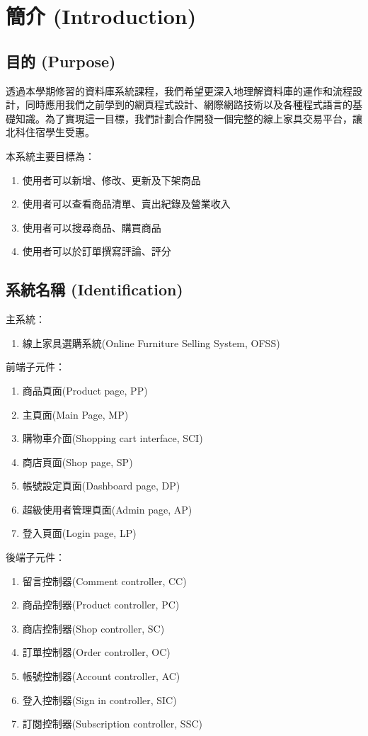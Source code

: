 \documentclass[a4paper, 12pt]{article}
\begin{document}

\section{簡介 (Introduction)}

\subsection{目的 (Purpose)}

透過本學期修習的資料庫系統課程，我們希望更深入地理解資料庫的運作和流程設計，同時應用我們之前學到的網頁程式設計、網際網路技術以及各種程式語言的基礎知識。為了實現這一目標，我們計劃合作開發一個完整的線上家具交易平台，讓北科住宿學生受惠。

本系統主要目標為：
\begin{enumerate}
  \item 使用者可以新增、修改、更新及下架商品
  \item 使用者可以查看商品清單、賣出紀錄及營業收入
  \item 使用者可以搜尋商品、購買商品
  \item 使用者可以於訂單撰寫評論、評分
\end{enumerate}

\subsection{系統名稱 (Identification)}
主系統：
\begin{enumerate}
    \item 線上家具選購系統(Online Furniture Selling System, OFSS)
\end{enumerate}
前端子元件：
\begin{enumerate}
    \item 商品頁面(Product page, PP)
    \item 主頁面(Main Page, MP)
    \item 購物車介面(Shopping cart interface, SCI)
    \item 商店頁面(Shop page, SP)
    \item 帳號設定頁面(Dashboard page, DP)
    \item 超級使用者管理頁面(Admin page, AP)
    \item 登入頁面(Login page, LP)
\end{enumerate}
後端子元件：
\begin{enumerate}
  \item 留言控制器(Comment controller, CC)
  \item 商品控制器(Product controller, PC)
  \item 商店控制器(Shop controller, SC)
  \item 訂單控制器(Order controller, OC)
  \item 帳號控制器(Account controller, AC)
  \item 登入控制器(Sign in controller, SIC)
  \item 訂閱控制器(Subscription controller, SSC)
\end{enumerate}
\end{document}
